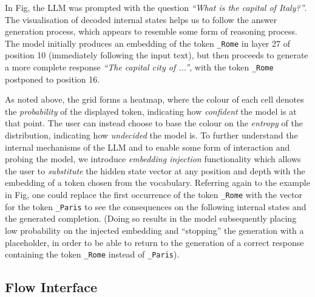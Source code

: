 {In Fig, the LLM was prompted with the question \emph{``What is the capital of Italy?''}.
The visualisation of decoded internal states helps us to follow the answer generation process, which appears to resemble some form of reasoning process.
The model initially produces an embedding of the token \texttt{\_Rome} in layer 27 of position 10 (immediately following the input text), but then proceeds to generate a more complete response \emph{``The capital city of ...''}, with the token \texttt{\_Rome} postponed to position 16.
    
As noted above, the grid forms a heatmap, where the colour of each cell denotes the \emph{probability} of the displayed token, indicating how \emph{confident} the model is at that point.
The user can instead choose to base the colour on the \emph{entropy} of the distribution, indicating how \emph{undecided} the model is.
To further understand the internal mechanisms of the LLM and to enable some form of interaction and probing the model, we introduce \emph{embedding injection} functionality which allows the user to \emph{substitute} the hidden state vector at any position and depth with the embedding of a token chosen from the vocabulary.
Referring again to the example in Fig, one could replace the first occurrence of the token \texttt{\_Rome} with the vector for the token \texttt{\_Paris} to see the consequences on the following internal states and the generated completion.
(Doing so results in the model subsequently placing low probability on the injected embedding and ``stopping'' the generation with a placeholder, in order to be able to return to the generation of a correct response containing the token \texttt{\_Rome} instead of \texttt{\_Paris}).
}


\subsection{Flow Interface}\label{sec:exp_intravisto_exp2}

